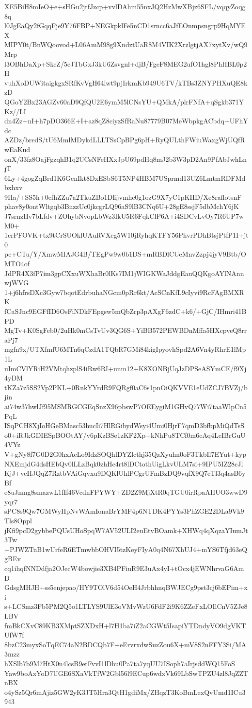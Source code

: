XE5BiH8mIeO+e+sHGu2jtfJzcp+vvlDAhm55nxJQ2HzMwXBjz6SFL/vqqyZoqg8q
l0JgEaQy2fGqqFje9Y76FBP+NEGkpklFe5nCD1srncc6aJfEOnmpsngrp9HqMYEX
MIPY0t/BnWQoovod+L06AmM98g9XndztUaR8M4VIK2XrzlgtjAX7xytXv/wQ9Mrp
l3OBhDaXp+SkcZ/5eJTbGxJ3kU6Zsvgnl+djB/FgcF8MEG2ufO1hgl8PhHBL0p2H
vuhXoDUWitaigkgxSRfKvVgH64lwt9pjIrkmKb949U6TV/kTBs3ZNYPHXuQE8kzD
QGoY2Bx23AGZv60aD9QfQU2E6ymM5lCNsYU+QMkA/plrFNfA+qSgkb371YKz//LI
dn4Zz+nI+h7pDO366E+I+az8qZ8ciyzSfRaNu87779B07MeWbpkgACbdq+UFhYdc
AZDz/bredS/tU6MmlMDykdLLLTSsCpBPg6pH+RyQULthFWiuWaxgWjUQfRwEaKud
onX/33fz8OajFgzqhB1q2UCsNFeHXxJpU69pdHq8mJ2b3W3pD2An9PfAbJwhLnjT
6Ly+4gogZqBrd1K6GenIkt8DxESbS6T5NP4HBM7USprmd13UZ6LmtmRDFMdbxhxv
9Ha/+SS5h+0efhZZu7a2TkuZBo1DIijvmhc0g1ozG9X7yC1pKHD/Xe8raflotsnF
phav8y0ontWltgqb3BnzzUc0jkcgrLQ96aS9lB3CNq6U+28gE8ssjF5dbMchY6jK
J7srnzHv7bLfdv+ZOhybNvopLbWz3IkU5R6FqkClP6A+i4SDCvLvOy7R6UP7wM0+
1crPFOVK+tx9tCrSUOklUAuRVXeg5W10jRyhqKTFY56PhvrPDhBtsjPtfP1I+jt0
pe+CTu/Y/XmwMIAJG4B/TEgPw9w0b1DS+mRBDlCUeMnvZzpj4jyV9Btb/OMTO4of
JdPR4X3fP7im3gpCXxuWXhaBr0lKs7IM1jWIGKWaJddgEauQQKgoAYlNAnnwjWVG
1+j6hfrsDXc3Gyw7bqotEdrbuhaNGcm0pRr6kt/AcSCnKfL9cIyvi9RcFAgBMXRK
fCaSJnc9EGFfID6OsFiNDkFEpgsw5mQbZrp3pAXgF6zdC+k6/+GjC/IHmri41BPD
MgTv+K0SgFeb0/2uHk0mCsTvUv3QG6S+YiBB572PEWBDnMffa5HXcpveQ8rraPj7
mgfn9x/UTXfmfU6MTn6qCzdA1TQbR7GMi84kigIpyovhSpd2A6Vn4yRhrE1lMp1L
uImCVlYRiH2VMtqhzplS4iRw6RI+unm12+K8XONBjUqJzDPSeASYmCE/f9Xj4yDM
tKZa7z5SS2Vp2PKL+0RnkYYrdR9FQRgf0aC6s1pnOiQKVVE1eUdZCJ7BVZj/bjin
ai74w37hwlJf95MSMRGCGEqSnzX96pbswP7OEEygiM1GHvQ77Wi7taaWlpCn5PqL
ISqPCH8XjIoHGeBMasc53hucIi7HlRGibydWsyi4Umi0HjrF7qmD3bfbpMiQdTsS
o0+iRJkGDIESpBOOtAY/v6pKzBSe1zKF2Xp+kNhPu8TCf0m6eAq4LeIBrGuU4VYz
V+gNy8f7G0D2G0hxAeLo9IdzSOQhlDYZlcthj35QzXyuhn0oF3TkbIl7EYut+kyp
NXEmjdG4dsHEbQv0lLLzBqk0zhHc4rt8lDCtothUigLkvULM7si+9IPU5IZ28cJl
KjJ+veHJQqZ7RztbVAiGqvxu9DQKlUhlPCgrUFmBzDQ9vqfX9Q7eTl3q4asB6yBf
e8uJnmg8smazwL1fIf46VcdnFPYWY+ZD2Z9MjXtR0qTGU0irRpaAHUO3wwD9yqr7
sPC8s9Qw7GMWyHpNvWAmIonaBrYMF4p6NTDK4PYYs3PhZGE22DLa9Vk9Tls8Oppl
jKfi9pcD2gybbePQUsUHoSpqW7AV52ULI2euEtvBOamk+XHWq4qXqzaYIumJt3Tw
+PJWZTnB1wUrfeR6ETmwbbOHVI5tzKeyFIyA0q4N67XhUJ4+mYS6Tfjd63eQgBEv
cq1ihqfNNDdfja2OJecW4bowjie3XB4PFiuR9E3uAx4yI+tOcx4jEWNhrvaG6AmD
GdsgMHJH+ss5enjepao/HY9TOlV6d54OeH4JrbhhnqBWJECg9pst3cj6bEPim+xi
s+LCSmz3Fb5PM2Q5o1LTLYS9UlE3oVMvWzU6FdF2i9K6ZZeFxLOIlCnV5ZJe8LBV
fmBkCXvC89KB3XMptSZXDxH+l7H1ba7iZ2aCGWt5IsapiYTDndyVO9dgVKTUfW7f
8bzC23myxSoTqEC74aN2BDCQb7F+eErvrxdwSuzZou6X+mV8S2nFFY3Si/MA3mzz
hXSlb7b9M7HtX0n4lcsB9etFvvI1lDhu0Pa7ta7yqUU7ISoph7aIrjsddWQ15FoS
Yaw9boAxYoD7UGE6SXaVkTfW2Gbl56l9ECup6wdxVk69LbSwTPZU4zl8JqZZTnBX
o4ySz5Qr6mAjiz5GW2yK3JT5Hra3QtH1gdiMx/ZHqzT3KoBmLexQvUmd1ICu3943

